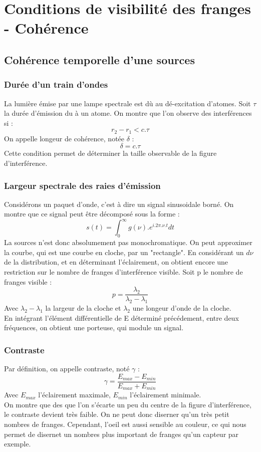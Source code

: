 \section{Conditions de visibilité des franges - Cohérence}
\subsection{Cohérence temporelle d'une sources}
\subsubsection{Durée d'un train d'ondes}
La lumière émise par une lampe spectrale est dù au dé-excitation d'atomes. Soit $\tau$ la durée d'émission du à un atome. On montre que l'on observe des interférences si : 
$$r_2 - r_1 < c.\tau$$
On appelle longeur de cohérence, notée $\delta$ : 
$$\delta = c.\tau$$ 
Cette condition permet de déterminer la taille observable de la figure d'interférence.
\subsubsection{Largeur spectrale des raies d'émission}
Considérons un paquet d'onde, c'est à dire un signal sinusoidale borné. On montre que ce signal peut être décomposé sous la forme : 
$$s(t) = \int_0^{\infty} g(\nu).e^{i.2\pi.\nu.t}dt$$
La sources n'est donc absolumement pas monochromatique. On peut approximer la courbe, qui est une courbe en cloche, par un "rectangle". En considérant un $d\nu$ de la distribution, et en déterminant l'éclairement, on obtient encore une restriction sur le nombre de franges d'interférence visible. Soit p le nombre de franges visible : 
$$p = \dfrac{\lambda_2}{\lambda_2-\lambda_1}$$
Avec $\lambda_2 - \lambda_1$ la largeur de la cloche et $\lambda_2$ une longeur d'onde de la cloche.\\
En intégrant l'élément différentielle de E déterminé précédement, entre deux fréquences, on obtient une porteuse, qui module un signal.
\subsubsection{Contraste}
Par définition, on appelle contraste, noté $\gamma$ : 
$$\gamma = \dfrac{E_{max} - E_{min}}{E_{max} + E_{min}}$$
Avec $E_{max}$ l'éclairement maximale, $E_{min}$ l'éclairement minimale.\\
On montre que des que l'on s'écarte un peu du centre de la figure d'interférence, le contraste devient très faible. On ne peut donc diserner qu'un très petit nombres de franges. Cependant, l'oeil est aussi sensible au couleur, ce qui nous permet de disernet un nombres plus important de franges qu'un capteur par exemple.
